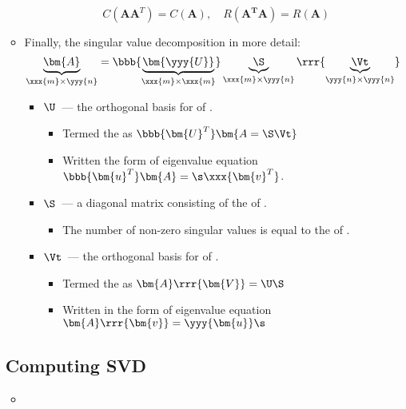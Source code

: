\begin{itemize}
\begin{itemize}
\begin{itemize}
        \[%
        C(\bm{AA}^T) = C(\bm{A}), \quad R(\bm{A^T A}) = R(\bm{A})
        \]%
      \end{itemize}
      \item Finally, the singular value decomposition in more detail:
      \[%
      \underbrace{\bm{A}}_{\xxx{m} \times \yyy{n}} = \bbb{\underbrace{\bm{\yyy{U}}}_{\xxx{m} \times \xxx{m}}} \underbrace{\S}_{\xxx{m} \times \yyy{n}} \rrr{\underbrace{\Vt}_{\yyy{n} \times \yyy{n}}}
      \]%
      \begin{itemize}
        \item \(\U\)~--- the orthogonal basis for  of .
          \begin{itemize}
            \item Termed the  as \(\bbb{\bm{U}^T}\bm{A = \S \Vt}\)
            \item Written the form of eigenvalue equation \(\bbb{\bm{u}^T}\bm{A}=\s \xxx{\bm{v}^T}\).
          \end{itemize}
        \item \(\S\)~--- a diagonal matrix consisting of the  of . 
          \begin{itemize}
            \item The number of non-zero singular values is equal to the \hyperref[Matrix Rank]{} of .
          \end{itemize}
        \item \(\Vt\)~--- the orthogonal basis for  of .
          \begin{itemize}
            \item Termed the  as \(\bm{A}\rrr{\bm{V}} = \U \S\)
            \item Written in the form of eigenvalue equation \(\bm{A}\rrr{\bm{v}}= \yyy{\bm{u}} \s\)
          \end{itemize}
      \end{itemize}
    \end{itemize}
  
  \subsection{Computing SVD}\label{Computing SVD}
  \begin{itemize}
    \item 
  \end{itemize}
    

\end{itemize}
